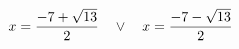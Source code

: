 \documentclass[preview]{standalone}
\begin{document}
\begin{align*}
\special{dvisvgm:raw <g id='unique000'>}x=\frac{-7 + \sqrt{13}}{2} \quad \lor \quad x=\frac{-7 - \sqrt{13}}{2}\special{dvisvgm:raw </g>}
\end{align*}
\end{document}

